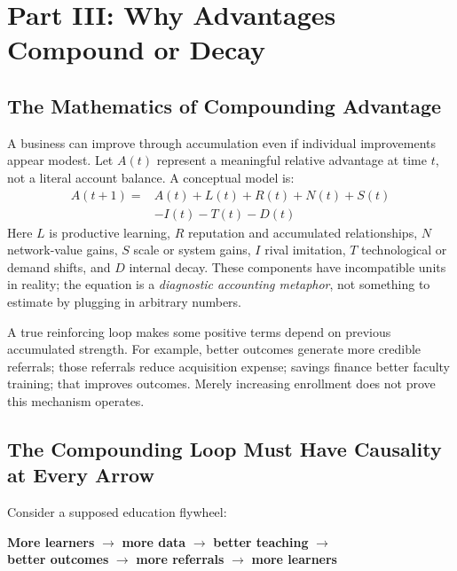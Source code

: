 \section*{Part III: Why Advantages Compound or Decay}
\label{sec:part3_why_advantages_compound_or_decay}

\subsection{The Mathematics of Compounding Advantage}
\label{sec:mathematics_of_compounding_advantage}

A business can improve through accumulation even if individual improvements appear modest. Let $A(t)$ represent a meaningful relative advantage at time $t$, not a literal account balance. A conceptual model is:
\begin{equation}
\label{eq:compounding_advantage}
\begin{split}
A(t+1) ={} & A(t) + L(t) + R(t) + N(t) + S(t) \\
           & - I(t) - T(t) - D(t)
\end{split}
\end{equation}
Here $L$ is productive learning, $R$ reputation and accumulated relationships, $N$ network-value gains, $S$ scale or system gains, $I$ rival imitation, $T$ technological or demand shifts, and $D$ internal decay. These components have incompatible units in reality; the equation is a \textit{diagnostic accounting metaphor}, not something to estimate by plugging in arbitrary numbers.

A true reinforcing loop makes some positive terms depend on previous accumulated strength. For example, better outcomes generate more credible referrals; those referrals reduce acquisition expense; savings finance better faculty training; that improves outcomes. Merely increasing enrollment does not prove this mechanism operates.

\subsection{The Compounding Loop Must Have Causality at Every Arrow}
\label{sec:compounding_loop_causality}

Consider a supposed education flywheel:
\begin{center}
\small
\textbf{More learners} $\to$ \textbf{more data} $\to$ \textbf{better teaching} $\to$ \\
\textbf{better outcomes} $\to$ \textbf{more referrals} $\to$ \textbf{more learners}
\end{center}

